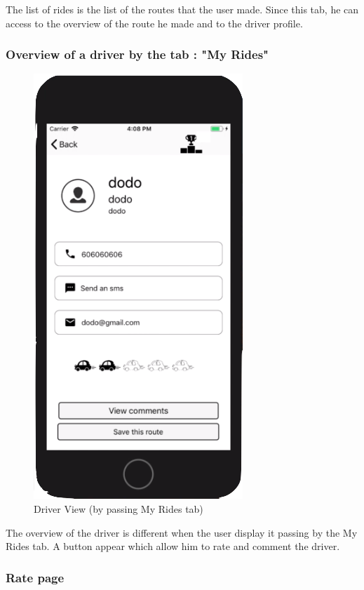 The list of rides is the list of the routes that the user made. Since this tab, he can access to the overview of the route he made and to the driver profile.

\subsubsection{Overview of a driver by the tab : "My Rides"}

\begin{figure}[h!]
\begin{center}
\includegraphics[scale = 0.3]{diagrams/DriverViewRides} 
\end{center}
\caption{Driver View (by passing My Rides tab)}
\end{figure}

The overview of the driver is different when the user display it passing by the My Rides tab. A button appear which allow him to rate and comment the driver.

\newpage

\subsubsection{Rate page}

